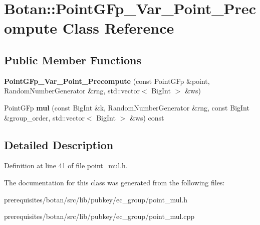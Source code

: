 \hypertarget{class_botan_1_1_point_g_fp___var___point___precompute}{}\section{Botan\+:\+:Point\+G\+Fp\+\_\+\+Var\+\_\+\+Point\+\_\+\+Precompute Class Reference}
\label{class_botan_1_1_point_g_fp___var___point___precompute}
\subsection*{Public Member Functions}
\begin{DoxyCompactItemize}
\item 
\mbox{\label{class_botan_1_1_point_g_fp___var___point___precompute_ad4e075bd3fc31f66899f06c8c6401e3f}} 
{\bfseries Point\+G\+Fp\+\_\+\+Var\+\_\+\+Point\+\_\+\+Precompute} (const Point\+G\+Fp \&point, Random\+Number\+Generator \&rng, std\+::vector$<$ Big\+Int $>$ \&ws)
\item 
\mbox{\label{class_botan_1_1_point_g_fp___var___point___precompute_a54f6b5d0c32da6e24091607aeb3e064c}} 
Point\+G\+Fp {\bfseries mul} (const Big\+Int \&k, Random\+Number\+Generator \&rng, const Big\+Int \&group\+\_\+order, std\+::vector$<$ Big\+Int $>$ \&ws) const
\end{DoxyCompactItemize}


\subsection{Detailed Description}


Definition at line 41 of file point\+\_\+mul.\+h.



The documentation for this class was generated from the following files\+:\begin{DoxyCompactItemize}
\item 
prerequisites/botan/src/lib/pubkey/ec\+\_\+group/point\+\_\+mul.\+h\item 
prerequisites/botan/src/lib/pubkey/ec\+\_\+group/point\+\_\+mul.\+cpp\end{DoxyCompactItemize}
